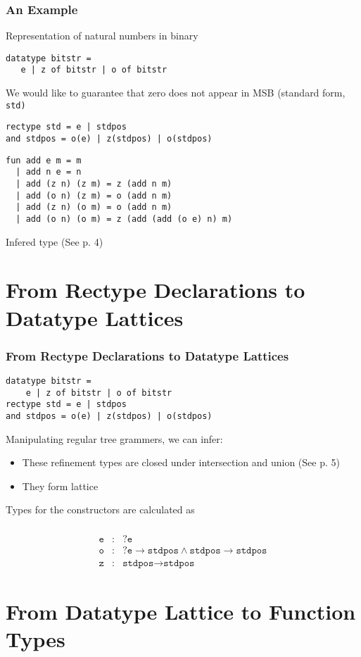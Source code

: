 \documentclass[dvipdfmx,cjk,xcolor=dvipsnames,envcountsect,notheorems,aspectratio=169]{beamer}
\theoremstyle{definition}
\begin{document}
\begin{frame}[fragile]
	\frametitle{An Example}
	Representation of natural numbers in binary
\begin{lstlisting}
datatype bitstr =
   e | z of bitstr | o of bitstr
\end{lstlisting}
	We would like to guarantee that zero does not appear in MSB (standard form, \tt{std})
\begin{lstlisting}
rectype std = e | stdpos
and stdpos = o(e) | z(stdpos) | o(stdpos)
\end{lstlisting}
\begin{lstlisting}
fun add e m = m
  | add n e = n
  | add (z n) (z m) = z (add n m)
  | add (o n) (z m) = o (add n m)
  | add (z n) (o m) = o (add n m)
  | add (o n) (o m) = z (add (add (o e) n) m)
\end{lstlisting}
	Infered type (See p. 4)
\end{frame}

\section{From Rectype Declarations to Datatype Lattices}

\begin{frame}[fragile]
	\frametitle{From Rectype Declarations to Datatype Lattices}
\begin{lstlisting}
datatype bitstr =
    e | z of bitstr | o of bitstr
rectype std = e | stdpos
and stdpos = o(e) | z(stdpos) | o(stdpos)
\end{lstlisting}
	{\Large Manipulating regular tree grammers, we can infer:}
	\begin{itemize}
		\item These refinement types are closed under intersection and union (See p. 5)
		\item They form lattice
	\end{itemize}
	{\Large Types for the constructors are calculated as}
	\frametitle{}
	\[
		\begin{array}{lcl}
			\texttt{e} & : & ?\texttt{e} \\
			\texttt{o} & : & ?\texttt{e} \to \texttt{stdpos} \land \texttt{stdpos} \to \texttt{stdpos} \\
			\texttt{z} & : & \texttt{stdpos} \to \texttt{stdpos}
		\end{array}
	\]
\end{frame}

\section{From Datatype Lattice to Function Types}
\end{document}
